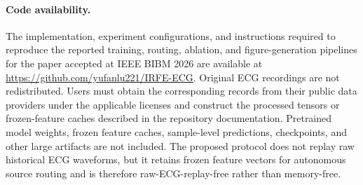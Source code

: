 \paragraph{Code availability.}
The implementation, experiment configurations, and instructions required to
reproduce the reported training, routing, ablation, and figure-generation
pipelines for the paper accepted at IEEE BIBM 2026 are available at
\url{https://github.com/yufanlu221/IRFE-ECG}. Original
ECG recordings are not redistributed. Users must obtain the corresponding
records from their public data providers under the applicable licenses and
construct the processed tensors or frozen-feature caches described in the
repository documentation. Pretrained model weights, frozen feature caches,
sample-level predictions, checkpoints, and other large artifacts are not
included. The proposed protocol does not replay raw historical ECG waveforms,
but it retains frozen feature vectors for autonomous source routing and is
therefore raw-ECG-replay-free rather than memory-free.
